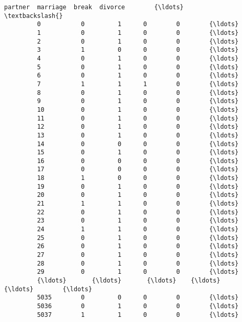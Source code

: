 \documentclass[11pt]{article}
\begin{document}
\begin{Verbatim}[commandchars=\\\{\}]
               partner  marriage  break  divorce        {\ldots}         \textbackslash{}
         0           0         1      0        0        {\ldots}          
         1           0         1      0        0        {\ldots}          
         2           0         1      0        0        {\ldots}          
         3           1         0      0        0        {\ldots}          
         4           0         1      0        0        {\ldots}          
         5           0         1      0        0        {\ldots}          
         6           0         1      0        0        {\ldots}          
         7           1         1      1        0        {\ldots}          
         8           0         1      0        0        {\ldots}          
         9           0         1      0        0        {\ldots}          
         10          0         1      0        0        {\ldots}          
         11          0         1      0        0        {\ldots}          
         12          0         1      0        0        {\ldots}          
         13          0         1      0        0        {\ldots}          
         14          0         0      0        0        {\ldots}          
         15          0         1      0        0        {\ldots}          
         16          0         0      0        0        {\ldots}          
         17          0         0      0        0        {\ldots}          
         18          1         0      0        0        {\ldots}          
         19          0         1      0        0        {\ldots}          
         20          0         1      0        0        {\ldots}          
         21          1         1      0        0        {\ldots}          
         22          0         1      0        0        {\ldots}          
         23          0         1      0        0        {\ldots}          
         24          1         1      0        0        {\ldots}          
         25          0         1      0        0        {\ldots}          
         26          0         1      0        0        {\ldots}          
         27          0         1      0        0        {\ldots}          
         28          0         1      0        0        {\ldots}          
         29          0         1      0        0        {\ldots}          
         {\ldots}       {\ldots}       {\ldots}    {\ldots}      {\ldots}        {\ldots}          
         5035        0         0      0        0        {\ldots}          
         5036        0         1      0        0        {\ldots}          
         5037        1         1      0        0        {\ldots}          

\end{Verbatim}
\end{document}
